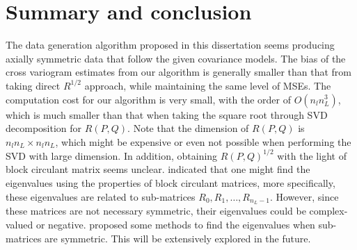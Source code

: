 \section{Summary and conclusion}
The data generation algorithm proposed in this dissertation seems producing axially symmetric data that follow the given covariance models. The bias of the cross variogram estimates from our algorithm is generally smaller than that from taking direct $R^{1/2}$ approach, while maintaining the same level of MSEs. The computation cost for our algorithm is very small, with the order of $O(n_l n_L^3)$, which is much smaller than that when taking the square root through SVD decomposition for $R(P,Q)$. Note that the dimension of $R(P,Q)$ is $n_ln_L \times n_ln_L$, which might be expensive or even not possible when performing the SVD with large dimension. In addition, obtaining $R(P,Q)^{1/2}$ with the light of block circulant matrix seems unclear. \cite{Li2013} indicated that one might find the eigenvalues using the properties of block circulant matrices, more specifically, these eigenvalues are related to sub-matrices $R_0, R_1, \ldots, R_{n_L-1}$. However, since these matrices are not necessary symmetric, their eigenvalues could be complex-valued or negative. \cite{Tee2005} proposed some methods to find the eigenvalues when sub-matrices are symmetric. This will be extensively explored in the future.

